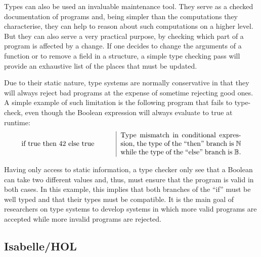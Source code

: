 Types can also be used an invaluable maintenance tool. They serve as a checked documentation of
programs and, being simpler than the computations they characterise, they can help to reason about
such computations on a higher level. But they can also serve a very practical purpose, by checking
which part of a program is affected by a change. If one decides to change the arguments of a
function or to remove a field in a structure, a simple type checking pass will provide an exhaustive
list of the places that must be updated.

Due to their static nature, type systems are normally conservative in that they will always reject
bad programs at the expense of sometime rejecting good ones. A simple example of such limitation is
the following program that fails to type-check, even though the Boolean expression will always
evaluate to true at runtime:
\begin{displaymath}
  \begin{tabular}{m{4.5cm} | m{6cm}}
    if true then 42 else true
    & Type mismatch in conditional expression, the type of the ``then'' branch is $\mathbb{N}$ while
    the type of the ``else'' branch is $\mathbb{B}$.
  \end{tabular}
\end{displaymath}

Having only access to static information, a type checker only see that a Boolean can take two
different values and, thus, must ensure that the program is valid in both cases. In this example,
this implies that both branches of the ``if'' must be well typed and that their types must be
compatible. It is the main goal of researchers on type systems to develop systems in which more
valid programs are accepted while more invalid programs are rejected.

\subsection{Isabelle/HOL}


